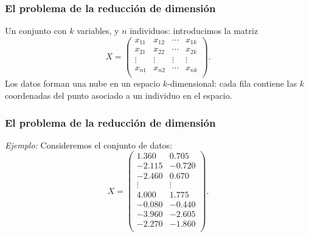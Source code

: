 \documentclass{beamer}
\begin{document}
 \begin{frame}\frametitle{El problema de la reducción de dimensión}
      \begin{overlayarea}{\textwidth}{6cm} 
   Un conjunto con $k$ variables, y $n$ individuos: introducimos la matriz
   \begin{equation*}\label{def:X}
X=\left(\begin{array}{llll}
x_{11}&x_{12}&\cdots&x_{1k}\\
x_{21}&x_{22}&\cdots&x_{2k}\\
\vdots&\vdots&\vdots&\vdots\\
x_{n1}&x_{n2}&\cdots&x_{nk}\\
\end{array}\right).
\end{equation*}
  Los datos forman una nube en un espacio $k$-dimensional: cada fila contiene las $k$ coordenadas del punto asociado a un individuo en el espacio.
      \end{overlayarea}
 \end{frame}
 \begin{frame}\frametitle{El problema de la reducción de dimensión}
      \begin{overlayarea}{\textwidth}{6cm} 
\textit{Ejemplo:} Consideremos el conjunto de datos: 
 $$X=\left(\begin{array}{rr}
  1.360&  0.705\\
 -2.115& -0.720\\
 -2.460&  0.670\\
  \vdots & \vdots\\
  4.000&  1.775\\
 -0.080& -0.440\\
 -3.960& -2.605\\
 -2.270& -1.860\\
\end{array}\right).$$

      \end{overlayarea}
 \end{frame}
\end{document}
